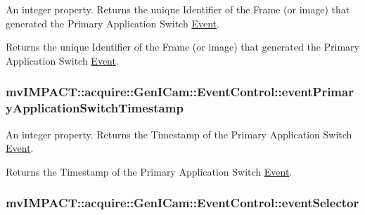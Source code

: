 An integer property. Returns the unique Identifier of the Frame (or image) that generated the Primary Application Switch \hyperlink{classmv_i_m_p_a_c_t_1_1acquire_1_1_event}{Event}. 

Returns the unique Identifier of the Frame (or image) that generated the Primary Application Switch \hyperlink{classmv_i_m_p_a_c_t_1_1acquire_1_1_event}{Event}. \hypertarget{classmv_i_m_p_a_c_t_1_1acquire_1_1_gen_i_cam_1_1_event_control_adb2477f8d9fc19acab3c3af89f7936de}{
\subsubsection[{event\+Primary\+Application\+Switch\+Timestamp}]{ mv\+I\+M\+P\+A\+C\+T\+::acquire\+::\+Gen\+I\+Cam\+::\+Event\+Control\+::event\+Primary\+Application\+Switch\+Timestamp}}\label{classmv_i_m_p_a_c_t_1_1acquire_1_1_gen_i_cam_1_1_event_control_adb2477f8d9fc19acab3c3af89f7936de}


An integer property. Returns the Timestamp of the Primary Application Switch \hyperlink{classmv_i_m_p_a_c_t_1_1acquire_1_1_event}{Event}. 

Returns the Timestamp of the Primary Application Switch \hyperlink{classmv_i_m_p_a_c_t_1_1acquire_1_1_event}{Event}. \hypertarget{classmv_i_m_p_a_c_t_1_1acquire_1_1_gen_i_cam_1_1_event_control_a1c19b680c25b8c3f179e74ebc668245d}{
\subsubsection[{event\+Selector}]{ mv\+I\+M\+P\+A\+C\+T\+::acquire\+::\+Gen\+I\+Cam\+::\+Event\+Control\+::event\+Selector}}\label{classmv_i_m_p_a_c_t_1_1acquire_1_1_gen_i_cam_1_1_event_control_a1c19b680c25b8c3f179e74ebc668245d}


